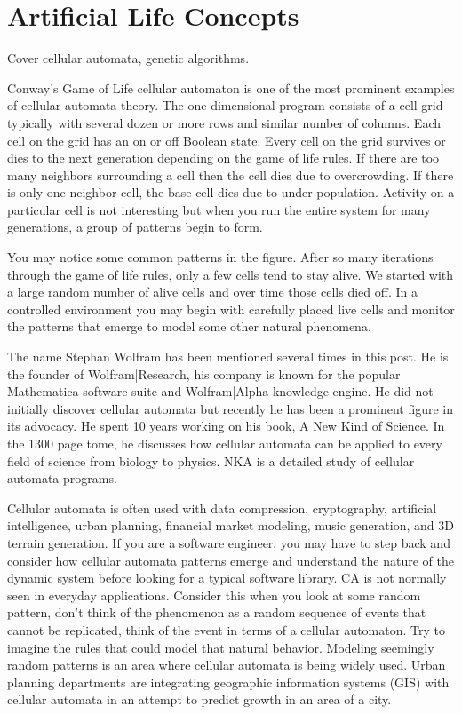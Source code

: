
\section{Artificial Life Concepts}

Cover cellular automata, genetic algorithms.

Conway's Game of Life cellular automaton is one of the most prominent examples
of cellular automata theory. The one dimensional program consists of a cell grid
typically with several dozen or more rows and similar number of columns. Each
cell on the grid has an on or off Boolean state. Every cell on the grid survives
or dies to the next generation depending on the game of life rules. If there are
too many neighbors surrounding a cell then the cell dies due to overcrowding. If
there is only one neighbor cell, the base cell dies due to under-population.
Activity on a particular cell is not interesting but when you run the entire
system for many generations, a group of patterns begin to form.

You may notice some common patterns in the figure. After so many iterations
through the game of life rules, only a few cells tend to stay alive. We started
with a large random number of alive cells and over time those cells died off. In
a controlled environment you may begin with carefully placed live cells and
monitor the patterns that emerge to model some other natural phenomena.

The name Stephan Wolfram has been mentioned several times in this post. He is
the founder of Wolfram|Research, his company is known for the popular
Mathematica software suite and Wolfram|Alpha knowledge engine. He did not
initially discover cellular automata but recently he has been a prominent figure
in its advocacy. He spent 10 years working on his book, A New Kind of Science.
In the 1300 page tome, he discusses how cellular automata can be applied to
every field of science from biology to physics. NKA is a detailed study of
cellular automata programs.

Cellular automata is often used with data compression, cryptography, artificial
intelligence, urban planning, financial market modeling, music generation, and
3D terrain generation. If you are a software engineer, you may have to step back
and consider how cellular automata patterns emerge and understand the nature of
the dynamic system before looking for a typical software library. CA is not
normally seen in everyday applications. Consider this when you look at some
random pattern, don't think of the phenomenon as a random sequence of events
that cannot be replicated, think of the event in terms of a cellular automaton.
Try to imagine the rules that could model that natural behavior. Modeling
seemingly random patterns is an area where cellular automata is being widely
used. Urban planning departments are integrating geographic information systems
(GIS) with cellular automata in an attempt to predict growth in an area of a
city.
